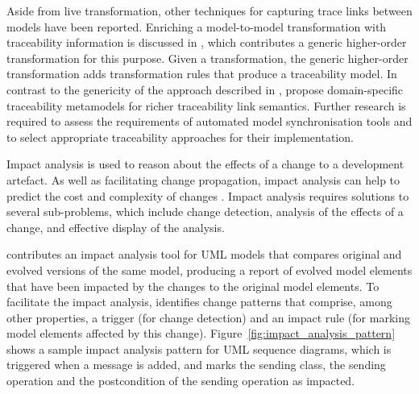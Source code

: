 Aside from live transformation, other techniques for capturing trace links between models have been reported. Enriching a model-to-model transformation with traceability information is discussed in \cite{jouault05loosely}, which contributes a generic higher-order transformation for this purpose. Given a transformation, the generic higher-order transformation adds transformation rules that produce a traceability model. In contrast to the genericity of the approach described in \cite{jouault05loosely}, \cite{drivalos08rigorously} propose domain-specific traceability metamodels for richer traceability link semantics. Further research is required to assess the requirements of automated model synchronisation tools and to select appropriate traceability approaches for their implementation.

Impact analysis is used to reason about the effects of a change to a development artefact. As well as facilitating change propagation, impact analysis can help to predict the cost and complexity of changes \cite{bohner02impactanalysis}. Impact analysis requires solutions to several sub-problems, which include change detection, analysis of the effects of a change, and effective display of the analysis.

\cite{briand03impactanalysis} contributes an impact analysis tool for UML models that compares original and evolved versions of the same model, producing a report of evolved model elements that have been impacted by the changes to the original model elements. To facilitate the impact analysis, \cite{briand03impactanalysis} identifies change patterns that comprise, among other properties, a trigger (for change detection) and an impact rule (for marking model elements affected by this change). Figure~\ref{fig:impact_analysis_pattern} shows a sample impact analysis pattern for UML sequence diagrams, which is triggered when a message is added, and marks the sending class, the sending operation and the postcondition of the sending operation as impacted.

